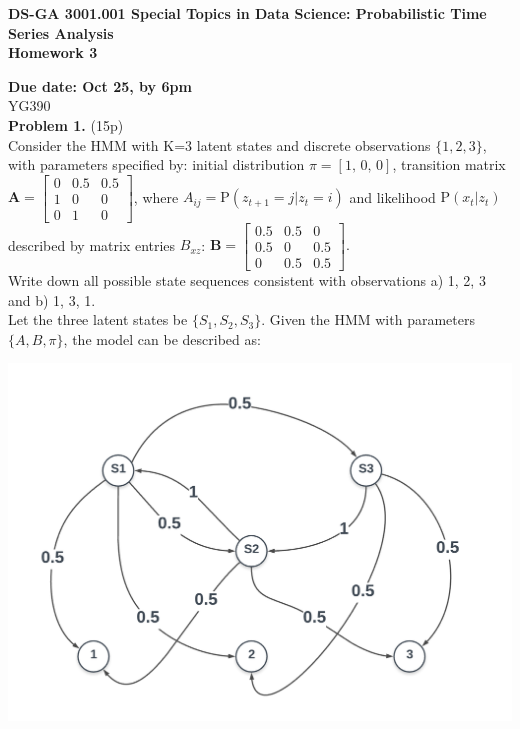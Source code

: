 \documentclass[12pt]{article}
\begin{document}
\thispagestyle{empty}
\begin{center}

\textbf{DS-GA 3001.001 Special Topics in Data Science: Probabilistic Time Series Analysis\\
Homework 3}
\end{center}


\noindent \textbf{Due date: Oct 25, by 6pm}\\
\noindent YG390\\

\noindent \textbf{Problem 1.} (15p)\\
Consider the HMM with K=3 latent states and discrete observations $\{1,2,3\}$, with parameters specified by:
initial distribution $\pi = [1, \, 0,\, 0]$, 
transition matrix 
$ \mathbf{A} = \begin{bmatrix}
    0 & 0.5 & 0.5\\
    1 & 0 & 0 \\
    0 & 1 & 0
    \end{bmatrix}
$, where $A_{ij} = \mathrm{P}(z_{t+1}= j | z_t= i)$ 
and likelihood $\mathrm{P}(x_t|z_t)$ described by matrix entries $B_{xz}$:
$ \mathbf{B} =  \begin{bmatrix}
    0.5 & 0.5 & 0 \\
    0.5 & 0 & 0.5 \\
    0 & 0.5 & 0.5
    \end{bmatrix}.
    $\\
 Write down all possible state sequences consistent with observations a) 1, 2, 3 and b) 1, 3, 1.\\
Let the three latent states be $\{ S_1, S_2, S_3 \}$. Given the HMM with parameters $\{A,B,\pi\}$, the model can be described as:

\begin{center}
	\includegraphics[width=1\linewidth]{figures/problem-1-1.png} 
\end{center}
\end{document}
